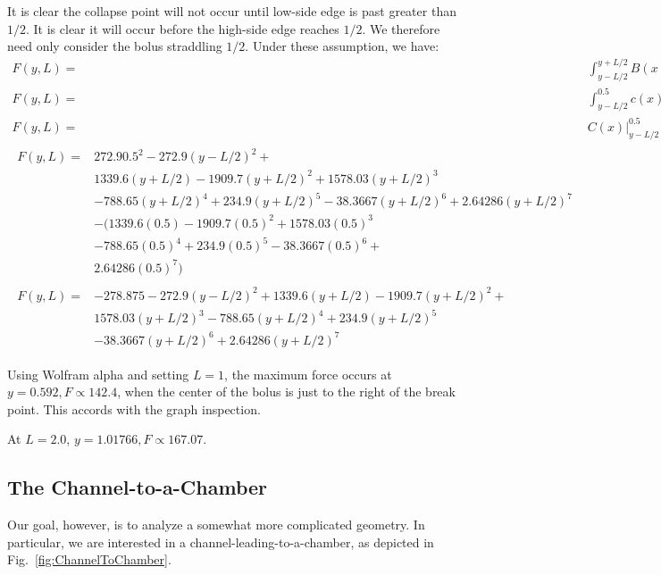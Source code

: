 \documentclass[]{asme2ej}
\begin{document}
It is clear the collapse point will not occur until low-side edge is past greater than $1/2$. It is clear it will occur before the high-side edge reaches $1/2$. We therefore need only consider the bolus straddling
$1/2$.
Under these assumption, we have:
\begin{align}
  F(y,L) = & \int_{y-L/2}^{y+L/2} B(x) dx \\
  F(y,L) = & \int_{y-L/2}^{0.5} c(x) dx  + \int_{0.5}^{y+L/2} q(x) dx   \\
  F(y,L) = & C(x) \bigg\rvert_{y-L/2}^{0.5}   +  Q(x) \bigg\rvert_{0.5}^{y+L/2} \\
  \begin{split}
  F(y,L) = & 272.9 0.5^2 - 272.9 (y-L/2)^2 + \\
  & 1339.6 (y+L/2) - 1909.7 (y+L/2)^2 + 1578.03 (y+L/2)^3 \\
  & - 788.65 (y+L/2)^4 + 234.9 (y+L/2)^5 - 38.3667 (y+L/2)^6 + 2.64286 (y+L/2)^7 \\
  & -(  1339.6 (0.5) - 1909.7 (0.5)^2 + 1578.03 (0.5)^3 \\
  & - 788.65 (0.5)^4 + 234.9 (0.5)^5 - 38.3667 (0.5)^6 + \\
  & 2.64286 (0.5)^7)
  \end{split} \\
  \begin{split}
  F(y,L) = & -278.875 - 272.9 (y-L/2)^2 + 1339.6 (y+L/2) - 1909.7 (y+L/2)^2 + \\
  & 1578.03 (y+L/2)^3 - 788.65 (y+L/2)^4 + 234.9 (y+L/2)^5 \\
  & - 38.3667 (y+L/2)^6 + 2.64286 (y+L/2)^7
  \end{split}
    \label{eq:force}
\end{align}

Using Wolfram alpha and setting $L = 1$, the maximum force occurs
at $y = 0.592, F \propto 142.4 $, when the center of the bolus is just to the right
of the break point. This accords with the graph inspection.

At $L = 2.0$, $y = 1.01766, F \propto 167.07$.


\subsection{The Channel-to-a-Chamber}

Our goal, however, is to analyze a somewhat more complicated geometry.
In particular, we are interested in a channel-leading-to-a-chamber,
as depicted in Fig.~\ref{fig:ChannelToChamber}.
\end{document}
